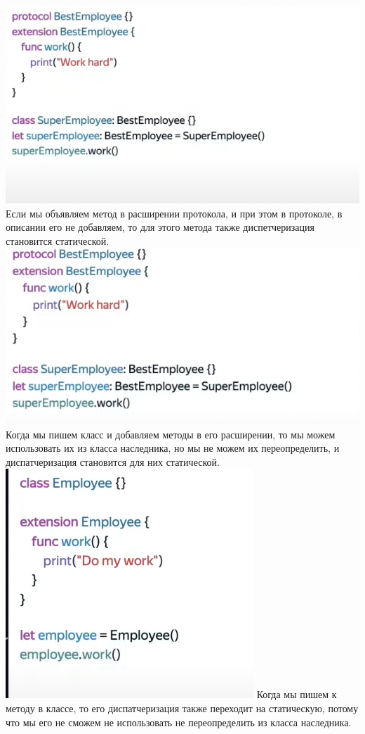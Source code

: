 \documentclass{article}
\begin{document}
    \includegraphics[scale = 0.5]{pic/Снимок экрана 2023-07-28 в 19.12.04.png}
    \newline
    Если мы объявляем метод в расширении протокола, и при этом в протоколе, в описании его не добавляем, то для этого метода также диспетчеризация становится статической. 
    \newline
    \includegraphics[scale = 0.5]{pic/Снимок экрана 2023-07-28 в 19.13.09.png}
    \newline
    Когда мы пишем класс и добавляем методы в его расширении, то мы можем использовать их из класса наследника, но мы не можем их переопределить, и диспатчеризация становится для них статической. 
    \newline
    \includegraphics[scale = 0.5]{pic/Снимок экрана 2023-07-28 в 19.14.41.png}
    \newline
    Когда мы пишем  к методу в классе, то его диспатчеризация также переходит на статическую, потому что мы его не сможем не использовать не переопределить из класса наследника. 
\end{document}
